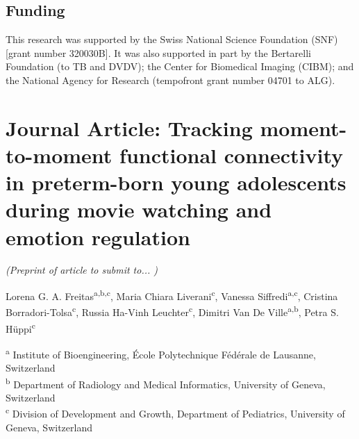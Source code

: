 \subsection*{Funding}
This research was supported by the Swiss National Science Foundation (SNF) [grant number 320030B]. It was also supported in part by the Bertarelli Foundation (to TB and DVDV); the Center for Biomedical Imaging (CIBM); and the National Agency for Research (tempofront grant number 04701 to ALG).




\clearpage

\section{Journal Article: Tracking moment-to-moment functional connectivity in preterm-born young adolescents during movie watching and emotion regulation}\label{section:ppicaps_preterm}

\begin{center}
 \textit{(Preprint of article to submit to... )}
 
Lorena G. A. Freitas\textsuperscript{a,b,c}, 
Maria Chiara Liverani\textsuperscript{c}, 
Vanessa Siffredi\textsuperscript{a,c}, 
Cristina Borradori-Tolsa\textsuperscript{c}, 
Russia Ha-Vinh Leuchter\textsuperscript{c},
Dimitri Van De Ville\textsuperscript{a,b},
Petra S. Hüppi\textsuperscript{c}
\end{center}
\textsuperscript{a} Institute of Bioengineering, École Polytechnique Fédérale de Lausanne, Switzerland \\
\textsuperscript{b} Department of Radiology and Medical Informatics, University of Geneva, Switzerland \\
\textsuperscript{c} Division of Development and Growth, Department of Pediatrics, University of Geneva, Switzerland \\

